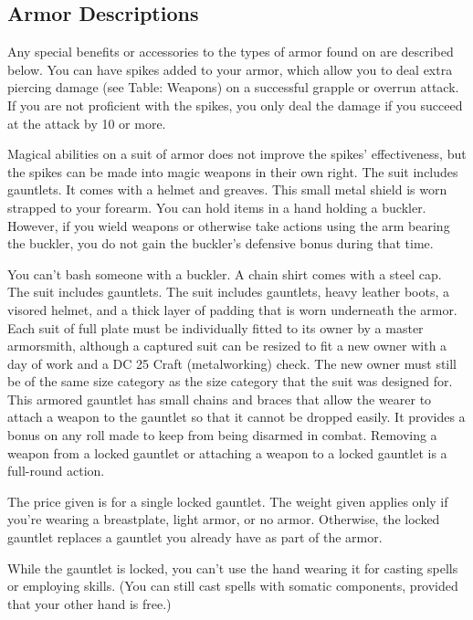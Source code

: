 \subsection{Armor Descriptions}
Any special benefits or accessories to the types of armor found on  are described below.
 You can have spikes added to your armor, which allow you to deal extra piercing damage (see Table: Weapons) on a successful grapple or overrun attack. If you are not proficient with the spikes, you only deal the damage if you succeed at the attack by 10 or more.
\par Magical abilities on a suit of armor does not improve the spikes' effectiveness, but the spikes can be made into magic weapons in their own right.
 The suit includes gauntlets.
 It comes with a helmet and greaves.
 This small metal shield is worn strapped to your forearm.
You can hold items in a hand holding a buckler.
However, if you wield weapons or otherwise take actions using the arm bearing the buckler, you do not gain the buckler's defensive bonus during that time.
\par You can't bash someone with a buckler.
 A chain shirt comes with a steel cap.
 The suit includes gauntlets.
 The suit includes gauntlets, heavy leather boots, a visored helmet, and a thick layer of padding that is worn underneath the armor. Each suit of full plate must be individually fitted to its owner by a master armorsmith, although a captured suit can be resized to fit a new owner with a day of work and a DC 25 Craft (metalworking) check. The new owner must still be of the same size category as the size category that the suit was designed for.
 This armored gauntlet has small chains and braces that allow the wearer to attach a weapon to the gauntlet so that it cannot be dropped easily. It provides a  bonus on any roll made to keep from being disarmed in combat. Removing a weapon from a locked gauntlet or attaching a weapon to a locked gauntlet is a full-round action.
\par The price given is for a single locked gauntlet. The weight given applies only if you're wearing a breastplate, light armor, or no armor. Otherwise, the locked gauntlet replaces a gauntlet you already have as part of the armor.
\par While the gauntlet is locked, you can't use the hand wearing it for casting spells or employing skills. (You can still cast spells with somatic components, provided that your other hand is free.)
